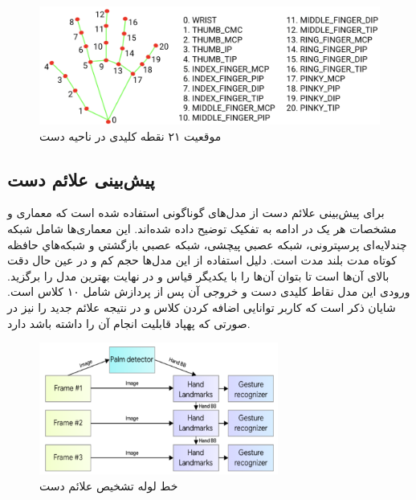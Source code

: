 \begin{figure}[h]
    \centering
    \includegraphics[width=1\textwidth]{hand-landmarks.png}
    \caption[موقعیت ۲۱ نقطه کلیدی در ناحیه دست]{موقعیت ۲۱ نقطه کلیدی در ناحیه دست \cite{zhang2020mediapipe}}
\end{figure}


\subsection{پیش‌بینی علائم دست}
برای پیش‌بینی علائم دست از مدل‌های گوناگونی استفاده شده است که معماری و مشخصات هر یک در ادامه به تفکیک توضیح داده‌ شده‌اند. این معماری‌ها شامل شبكه چندلایه‌ای پرسپترونی، شبكه عصبي پیچشی، شبكه عصبي بازگشتي و شبكه‌هاي حافظه كوتاه مدت بلند مدت است. دلیل استفاده از این مدل‌ها حجم کم و در عین حال دقت بالای آن‌ها است تا بتوان آن‌ها را با یکدیگر قیاس و در نهایت بهترین مدل را برگزید. 
ورودی این مدل نقاط کلیدی دست و خروجی آن پس از پردازش شامل ۱۰ کلاس است. شایان ذکر است که کاربر توانایی اضافه کردن کلاس و در نتیجه علائم جدید را نیز در صورتی که پهپاد قابلیت انجام آن را داشته باشد دارد.

\begin{figure}[h]
    \centering
    \includegraphics[width=0.7\textwidth]{mediapipe.png}
    \caption[خط لوله تشخیص علائم دست]{خط لوله تشخیص علائم دست \cite{zhang2020mediapipe}}
\end{figure}

